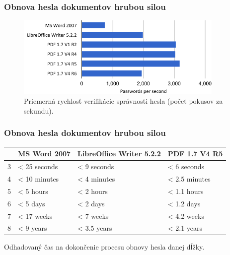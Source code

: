 \documentclass[xcolor=dvipsnames]{beamer}
\begin{document}

\begin{frame}
	\frametitle{Obnova hesla dokumentov hrubou silou}
	
	\begin{figure}[h]
		\centering
		\includegraphics[width=100mm]{images/average_speed.pdf} \\	
		\bigskip
		\scriptsize{Priemerná rychlosť verifikácie správnosti hesla (počet pokusov za sekundu).}	
	\end{figure}
\end{frame}


\begin{frame}
	\frametitle{Obnova hesla dokumentov hrubou silou}
	
	 \begin{table}[h]
	\centering
	\begin{tabular}{|l|l|l|l|}
           \hline
		&\textbf{MS Word 2007}&\textbf{LibreOffice Writer 5.2.2}&\textbf{PDF 1.7 V4 R5}\\
	\hline
		3&< 25 seconds&< 9 seconds&< 6 seconds\\
	\hline
		4&< 10 minutes&< 4 minutes&< 2.5 minutes\\
	\hline
		5&< 5 hours& < 2 hours&< 1.1 hours\\
	\hline
		6&< 5 days&< 2 days&< 1.2 days\\
	\hline
		7&< 17 weeks&< 7 weeks&< 4.2 weeks\\
	\hline
		8&< 9 years&< 3.5 years&< 2.1 years\\
	\hline
           \end{tabular}
	\end{table}
\begin{center}	
	\vspace{-5mm}
	\scriptsize{Odhadovaný čas na dokončenie procesu obnovy hesla danej dĺžky.}
\end{center}
\end{frame}
\end{document}
